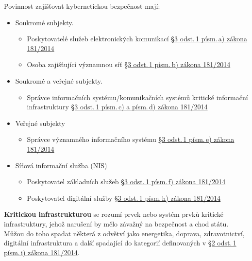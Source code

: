 Povinnost zajišťovat kybernetickou bezpečnost mají:
\begin{itemize}[noitemsep]
    \item Soukromé subjekty.
    \begin{itemize}[noitemsep]
        \item Poskytovatelé služeb elektronických komunikací \href{https://www.zakonyprolidi.cz/cs/2014-181#p3-1-a}{§3 odst.\,1 písm.\,a) zákona\\ 181/2014}
        \item Osoba zajišťující významnou síť \href{https://www.zakonyprolidi.cz/cs/2014-181#p3-1-b}{§3 odst.\,1 písm.\,b) zákona 181/2014}
    \end{itemize}
    \item Soukromé a veřejné subjekty.
    \begin{itemize}[noitemsep]
        \item Správce informačních systému/komunikačních systémů kritické informační infrastruktury \href{https://www.zakonyprolidi.cz/cs/2014-181#p3-1-c}{§3 odst.\,1 písm.\,c) a písm.\,d) zákona 181/2014}
    \end{itemize}
    \item Veřejné subjekty
    \begin{itemize}[noitemsep]
        \item Správce významného informačního systému \href{https://www.zakonyprolidi.cz/cs/2014-181#p3-1-e}{§3 odst.\,1 písm.\,e) zákona 181/2014}
    \end{itemize}
    \item Síťová informační služba (NIS)
    \begin{itemize}[noitemsep]
        \item Poskytovatel základních služeb \href{https://www.zakonyprolidi.cz/cs/2014-181#p3-1-f}{§3 odst.\,1 písm.\,f) zákona 181/2014}
        \item Poskytovatel digitální služby \href{https://www.zakonyprolidi.cz/cs/2014-181#p3-1-h}{§3 odst.\,1 písm.\,h) zákona 181/2014}
    \end{itemize}
\end{itemize}

\noindent\textbf{Kritickou infrastrukturou} se rozumí prvek nebo systém prvků kritické infrastruktury, jehož narušení by mělo závažný na bezpečnost a chod státu. Můžou do toho spadat některá z odvětví jako energetika, doprava, zdravotnictví, digitální infrastruktura a další spadající do kategorií definovaných v \href{https://www.zakonyprolidi.cz/cs/2014-181#p2-1-i}{§2 odst.\,1 písm.\,i)  zákona 181/2014}.

